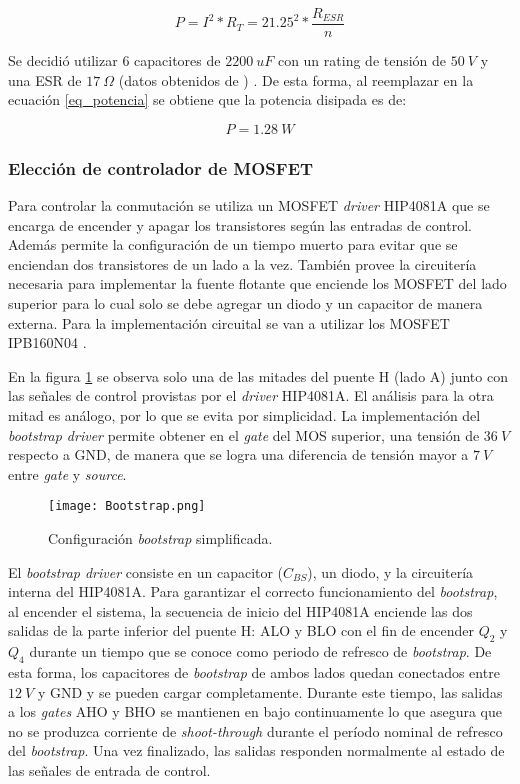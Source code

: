 \begin{equation}\label{eq_potencia} 
	P = I^2 * R_T = 21.25^2 * \frac{R_{ESR}}{n}
\end{equation}

\noindent Se decidió utilizar 6 capacitores  de $2200 \:uF$ con un rating de tensión de $50\:V$ y una ESR de $17 \:\Omega$ (datos obtenidos de \cite{EKY-350ELL222MM25S}) . De esta forma, al reemplazar en la ecuación \ref{eq_potencia} se obtiene que la potencia disipada es de: 

\begin{equation} 
	P=1.28\:W
\end{equation}

\subsubsection{Elección de controlador de MOSFET}

\noindent Para controlar la conmutación se utiliza un MOSFET \textsl{driver} HIP4081A \cite{HIP4081A_FN3659} que se encarga de encender y apagar los transistores según las entradas de control. Además permite la configuración de un tiempo muerto para evitar que se enciendan dos transistores de un lado a la vez. También provee la circuitería necesaria para implementar la fuente flotante que enciende los MOSFET del lado superior para lo cual solo se debe agregar un diodo y un capacitor de manera externa. Para la implementación circuital se van a utilizar los MOSFET IPB160N04 \cite{IPB160N04}.

\noindent En la figura \ref{fig:img_bootstrap} se observa solo una de las mitades del puente H (lado A)  junto con las señales de control provistas por el \textsl{driver} HIP4081A. El análisis para la otra mitad es análogo, por lo que se evita por simplicidad. La implementación del \textsl{bootstrap driver} permite obtener en el \textsl{gate} del MOS superior, una tensión de $36\:V$ respecto a GND, de manera que se logra una diferencia de tensión mayor a $7\:V$ entre \textsl{gate} y \textsl{source}. 

\begin{figure}[H]
	\centering
	\texttt{[image: Bootstrap.png]}
	\caption{Configuración \textsl{bootstrap} simplificada.}
	\label{fig:img_bootstrap}
\end{figure}

\noindent El \textsl{bootstrap driver} consiste en un capacitor ($C_{BS}$), un diodo, y la circuitería interna del HIP4081A. Para garantizar el correcto funcionamiento del \textsl{bootstrap}, al encender el sistema, la secuencia de inicio del HIP4081A enciende las dos salidas de la parte inferior del puente H: ALO y BLO con el fin de encender $Q_2$ y $Q_4$ durante un tiempo que se conoce como periodo de refresco de \textsl{bootstrap}. De esta forma, los capacitores de \textsl{bootstrap} de ambos lados quedan conectados entre $12\:V$ y GND y se pueden cargar completamente. Durante este tiempo, las salidas a los \textsl{gates} AHO y BHO se mantienen en bajo continuamente lo que asegura que no se produzca corriente de \textsl{shoot-through} durante el período nominal de refresco del \textsl{bootstrap}. Una vez finalizado, las salidas responden normalmente al estado de las señales de entrada de control.

